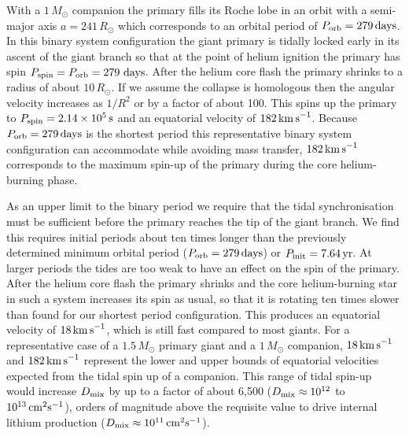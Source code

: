 \documentclass[twocolumn]{aastex62}
\begin{document}
With a $1\,M_\odot$ companion the primary fills its Roche lobe in an orbit with a 
semi-major axis $a = 241\,R_\odot$ which corresponds to an orbital period of 
$P_{\rm orb} = 279\,{\rm days}$. In this binary system configuration the giant
primary is tidally locked early in its ascent of the giant branch so that at the point
of helium ignition the primary has spin
$P_{\rm spin} = P_{\rm orb} = 279~{\rm days}$. After the helium core flash the
primary shrinks to a radius of about $10\,R_\odot$. If we assume the collapse
is homologous then the angular velocity increases as $1/R^2$ or by a factor
of about 100. This spins up the primary to 
$P_{\rm spin} = 2.14\times10^5\,{\rm s}$ and an equatorial velocity of $182\,\rm{km\,s}^{-1}$.
Because $P_{\rm orb} = 279\,{\rm days}$ is the shortest period this representative binary system configuration
can accommodate while avoiding mass transfer, $182\,\rm{km\,s}^{-1}$ corresponds 
to the maximum spin-up of the primary during the core helium-burning phase.

As an upper limit to the binary period we require that the tidal synchronisation must be sufficient
before the primary reaches the tip of the giant branch. We find this requires initial
periods about ten times longer than the previously determined minimum orbital period ($P_{\rm orb} = 279\,{\rm days}$) or $P_{\rm init} = 7.64\,{\rm yr}$. 
At larger periods the tides are too weak to have an effect on the spin of the
primary.
After the helium core flash the primary shrinks and the core helium-burning star
in such a system increases its spin as usual, so that it is rotating  ten times slower than found for our shortest period configuration. This produces an equatorial
velocity of $18\,{\rm km\,s}^{-1}$, which is still fast compared to most giants. For a representative case of a $1.5\,M_\odot$ primary giant and a $1\,M_\odot$
companion, $18\,{\rm km\,s}^{-1}$ and $182\,\rm{km\,s}^{-1}$ represent the
lower and upper bounds of equatorial velocities expected from the tidal spin up of
a companion. This range of tidal spin-up would increase $D_{\rm mix}$ by up to a factor of about 6,500 ($D_{\rm mix} \approx 10^{12}$ to $10^{13}\,{\rm cm}^{2}{\rm s}^{-1}$), orders of magnitude above the requisite value to drive internal lithium production ($D_{\rm mix} \approx 10^{11}\,{\rm cm}^{2}{\rm s}^{-1}$). 
\end{document}
